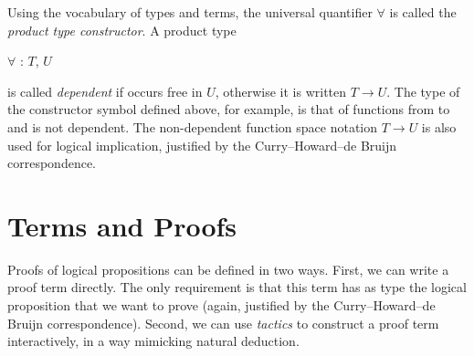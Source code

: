 Using the vocabulary of types and terms, the universal quantifier
$\forall$ is called the \emph{product type constructor}. A product
type \begin{coqdoccode}$\forall$  : $T$,
  $U$\end{coqdoccode} is called \emph{dependent} if  occurs free
in $U$, otherwise it is written $T \rightarrow U$. The type of the
constructor symbol  defined above, for example,
is that of functions from
to
and is not dependent. The non-dependent function space notation $T \rightarrow
U$ is also used for logical implication, justified by the Curry--Howard--de
Bruijn correspondence.


\section{Terms and Proofs}

Proofs of logical propositions can be defined in two ways. First, we
can write a proof term directly. The only requirement is that this
term has as type the logical proposition that we want to
prove (again, justified by the Curry--Howard--de Bruijn
correspondence). Second, we can use \emph{tactics} to construct a proof term
interactively, in a way mimicking natural deduction.

